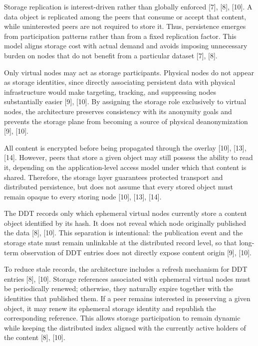 \documentclass[12pt,a4paper]{article}
\begin{document}
Storage replication is interest-driven rather than globally enforced [7], [8], [10]. A data object is replicated among the peers that consume or accept that content, while uninterested peers are not required to store it. Thus, persistence emerges from participation patterns rather than from a fixed replication factor. This model aligns storage cost with actual demand and avoids imposing unnecessary burden on nodes that do not benefit from a particular dataset [7], [8].

Only virtual nodes may act as storage participants. Physical nodes do not appear as storage identities, since directly associating persistent data with physical infrastructure would make targeting, tracking, and suppressing nodes substantially easier [9], [10]. By assigning the storage role exclusively to virtual nodes, the architecture preserves consistency with its anonymity goals and prevents the storage plane from becoming a source of physical deanonymization [9], [10].

All content is encrypted before being propagated through the overlay [10], [13], [14]. However, peers that store a given object may still possess the ability to read it, depending on the application-level access model under which that content is shared. Therefore, the storage layer guarantees protected transport and distributed persistence, but does not assume that every stored object must remain opaque to every storing node [10], [13], [14].

\thesisephemeraltikz

The DDT records only which ephemeral virtual nodes currently store a content object identified by its hash. It does not reveal which node originally published the data [8], [10]. This separation is intentional: the publication event and the storage state must remain unlinkable at the distributed record level, so that long-term observation of DDT entries does not directly expose content origin [9], [10].

To reduce stale records, the architecture includes a refresh mechanism for DDT entries [8], [10]. Storage references associated with ephemeral virtual nodes must be periodically renewed; otherwise, they naturally expire together with the identities that published them. If a peer remains interested in preserving a given object, it may renew its ephemeral storage identity and republish the corresponding reference. This allows storage participation to remain dynamic while keeping the distributed index aligned with the currently active holders of the content [8], [10].
\end{document}
